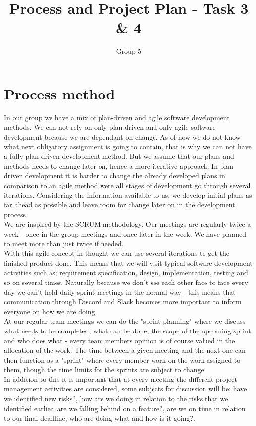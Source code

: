 \documentclass{article}
\title{Process and Project Plan - Task 3 \& 4}
\author{Group 5}
\date{}
\begin{document}
    \maketitle
    
    \section{Process method}
    \noindent
    In our group we have a mix of plan-driven and agile software development methods. We can not rely on only plan-driven and only agile software development because we are dependant on change. As of now we do not know what next obligatory assignment is going to contain, that is why we can not have a fully plan driven development method. But we assume that our plans and methods needs to change later on, hence a more iterative approach. In plan driven development it is harder to change the already developed plans in comparison to an agile method were all stages of development go through several iterations. Considering the information available to us, we develop initial plans as far ahead as possible and leave room for change later on in the development process. \\

    \noindent
    We are inspired by the SCRUM methodology. Our meetings are regularly twice a week - once in the group meetings and once later in the week. We have planned to meet more than just twice if needed. \\
    With this agile concept in thought we can use several iterations to get the finished product done. This means that we will visit typical software development activities such as; requirement specification, design, implementation, testing and so on several times. Naturally because we don't see each other face to face every day we can't hold daily sprint meetings in the normal way - this means that communication through Discord and Slack becomes more important to inform everyone on how we are doing. \\
    At our regular team meetings we can do the "sprint planning" where we discuss what needs to be completed, what can be done, the scope of the upcoming sprint and who does what - every team members opinion is of course valued in the allocation of the work. The time between a given meeting and the next one can then function as a "sprint" where every member work on the work assigned to them, though the time limits for the sprints are subject to change. \\
    In addition to this it is important that at every meeting the different project management activities are considered, some subjects for discussion will be; have we identified new risks?, how are we doing in relation to the risks that we identified earlier, are we falling behind on a feature?, are we on time in relation to our final deadline, who are doing what and how is it going?.
\end{document}
